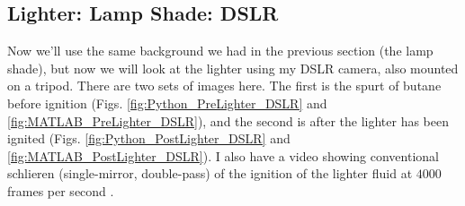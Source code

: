 \documentclass[letterpaper,12pt]{article}
\begin{document}
\subsection{Lighter: Lamp Shade: DSLR}
\label{subsec:Lighter_Lamp_Shade_DSLR}

Now we'll use the same background we had in the previous section (the lamp shade), but now we will look at the lighter using my DSLR camera, also mounted on a tripod.  There are two sets of images here.  The first is the spurt of butane before ignition (Figs. \ref{fig:Python_PreLighter_DSLR} and \ref{fig:MATLAB_PreLighter_DSLR}), and the second is after the lighter has been ignited (Figs. \ref{fig:Python_PostLighter_DSLR} and \ref{fig:MATLAB_PostLighter_DSLR}).  I also have a video showing conventional schlieren (single-mirror, double-pass) of the ignition of the lighter fluid at $4000$ frames per second \cite{JTE_Lighter}.
\end{document}
